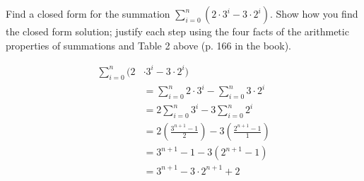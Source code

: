 \begin{questions}



 Find a closed form for the summation $\displaystyle \sum_{i=0}^n (2 \cdot 3^i - 3 \cdot 2^i)$.   Show how you find the closed form solution; justify each step using the four facts of the arithmetic properties of summations and Table 2 above (p. 166 in the book).
    \ifprintanswers
        \vspace{-10pt}
   \fi
\begin{solution}
\begin{align*}
  \sum_{i=0}^n (2 &\cdot 3^i - 3 \cdot 2^i) \\
     &= \sum_{i=0}^n 2 \cdot 3^i - \sum_{i=0}^n 3 \cdot 2^i \tag{Fact 3} \\
     &= 2 \sum_{i=0}^n 3^i - 3 \sum_{i=0}^n 2^i \tag{Fact 4} \\
     &= 2 \left( \frac{3^{n+1} - 1}{2} \right) 
        - 3 \left( \frac{2^{n+1} - 1}{1} \right) \tag{Table 2.1} \\
     &= 3^{n+1} - 1 - 3(2^{n+1} - 1) \tag{algebra} \\
     &= 3^{n+1} - 3\cdot 2^{n+1} +2 \tag{algebra}
\end{align*}
\end{solution}




\end{questions}
